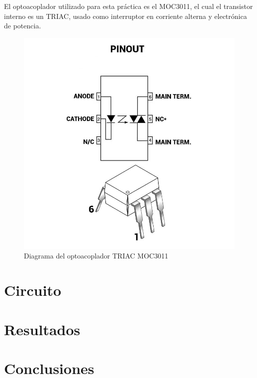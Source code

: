 \documentclass{article}
\begin{document}
El optoacoplador utilizado para esta práctica es el MOC3011, el cual el transistor interno es un TRIAC, usado como interruptor
en corriente alterna y electrónica de potencia.

\begin{figure}
    \centering
    \includegraphics[scale=0.5]{MOC3011.jpg}
    \caption{Diagrama del optoacoplador TRIAC MOC3011}
    \label{Fig: Diagrama del optoacoplador TRIAC MOC3011}
\end{figure}

\section{Circuito}


\section{Resultados}




\section{Conclusiones}

\printbibliography
\end{document}
